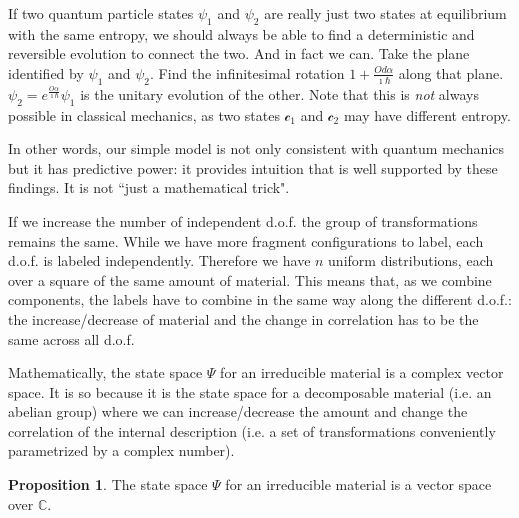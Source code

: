 \documentclass[smallextended]{svjour3}
\numberwithin{equation}{section}
\theoremstyle{definition}
\newtheorem{prop}[equation]{Proposition}
\begin{document}
If two quantum particle states $\psi_1$ and $\psi_2$ are really just two states at equilibrium with the same entropy, we should always be able to find a deterministic and reversible evolution to connect the two. And in fact we can. Take the plane identified by $\psi_1$ and $\psi_2$. Find the infinitesimal rotation $1 + \frac{Od\alpha}{\imath\hbar}$ along that plane. $\psi_2 = e^{\frac{O\alpha}{\imath\hbar}} \psi_1$ is the unitary evolution of the other. Note that this is \emph{not} always possible in classical mechanics, as two states $\mathcal{c}_1$ and $\mathcal{c}_2$ may have different entropy.

In other words, our simple model is not only consistent with quantum mechanics but it has predictive power: it provides intuition that is well supported by these findings. It is not ``just a mathematical trick".

If we increase the number of independent d.o.f. the group of transformations remains the same. While we have more fragment configurations to label, each d.o.f. is labeled independently. Therefore we have $n$ uniform distributions, each over a square of the same amount of material. This means that, as we combine components, the labels have to combine in the same way along the different d.o.f.: the increase/decrease of material and the change in correlation has to be the same across all d.o.f.

Mathematically, the state space $\Psi$ for an irreducible material is a complex vector space. It is so because it is the state space for a decomposable material (i.e. an abelian group) where we can increase/decrease the amount and change the correlation of the internal description (i.e. a set of transformations conveniently parametrized by a complex number).

\begin{prop}\label{prop:complex_vector_space}
	The state space $\Psi$ for an irreducible material is a vector space over $\mathbb{C}$.
\end{prop}
\end{document}
